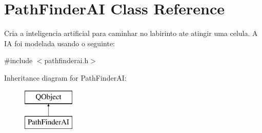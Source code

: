 \hypertarget{class_path_finder_a_i}{}\section{Path\+Finder\+A\+I Class Reference}
\label{class_path_finder_a_i}


Cria a inteligencia artificial para caminhar no labirinto ate atingir uma celula. A I\+A foi modelada usando o seguinte\+:  




{\ttfamily \#include $<$pathfinderai.\+h$>$}

Inheritance diagram for Path\+Finder\+A\+I\+:\begin{figure}[H]
\begin{center}
\leavevmode
\includegraphics[height=2.000000cm]{class_path_finder_a_i}
\end{center}
\end{figure}
